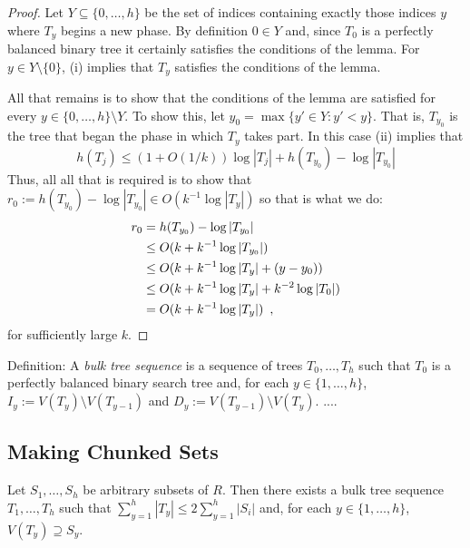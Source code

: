 \documentclass[kpfonts]{patmorin}
\newcommand{\snote}[1]{\fcolorbox{red}{yellow}{#1}}
\begin{document}
\begin{proof}
  Let $Y\subseteq\{0,\ldots,h\}$ be the set of indices containing exactly those indices $y$ where $T_y$ begins a new phase. By definition $0\in Y$ and, since $T_0$ is a perfectly balanced binary tree it certainly satisfies the conditions of the lemma.  For $y\in Y\setminus\{0\}$, 
  (i) implies that $T_y$ satisfies the conditions of the lemma.  
  
  All that remains is to show that the conditions of the lemma are satisfied for every $y\in\{0,\ldots,h\}\setminus Y$. To show this, let $y_0=\max\{ y'\in Y: y'<y\}$.  That is, $T_{y_0}$ is the tree that began the phase in which $T_y$ takes part.  In this case (ii) implies that
  \[  h(T_j) \le (1+O(1/k))\log |T_j| + h(T_{y_0})-\log|T_{y_0}| \]  
  Thus, all all that is required is to show that $r_0:=h(T_{y_0})-\log|T_{y_0}|\in O(k^{-1}\log|T_y|)$ so that is what we do:
  \begin{align*}
    r_0 &= h(T_{y_0})-\log|T_{y_0}| \\
       &\le O(k + k^{-1}\log|T_{y_0}|) \\
       &\le O(k + k^{-1}\log|T_{y}| + (y-y_0)) \\
       &\le O(k + k^{-1}\log|T_{y}| + k^{-2}\log|T_0|) \\
       &= O(k + k^{-1}\log|T_{y}|) \enspace , \qedhere
  \end{align*}
  for sufficiently large $k$. \snote{Again: quantify}
\end{proof}

Definition: A \emph{bulk tree sequence} is a sequence of trees $T_0,\ldots,T_h$ such that $T_0$ is a perfectly balanced binary search tree and, for each $y\in\{1,\ldots,h\}$, $I_y:=V(T_y)\setminus V(T_{y-1})$ and $D_y:= V(T_{y-1})\setminus V(T_y)$.  ....

\subsection{Making Chunked Sets}

\begin{lem}
  Let $S_1,\ldots,S_h$ be arbitrary subsets of $R$.  Then there exists a bulk tree sequence $T_1,\ldots,T_h$ such that $\sum_{y=1}^h |T_y|\le 2\sum_{y=1}^h |S_i|$ and, for each $y\in\{1,\ldots,h\}$, $V(T_y)\supseteq S_y$.
\end{lem}
  
\end{document}
